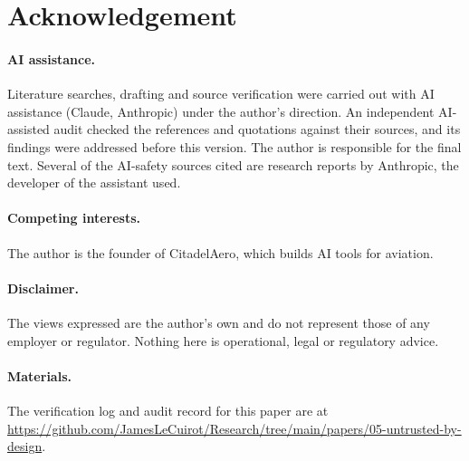 \documentclass[11pt]{article}
\begin{document}
\section*{Acknowledgement}
\paragraph{AI assistance.} Literature searches, drafting and source verification were carried out with AI assistance (Claude, Anthropic) under the author's direction. An independent AI-assisted audit checked the references and quotations against their sources, and its findings were addressed before this version. The author is responsible for the final text. Several of the AI-safety sources cited are research reports by Anthropic, the developer of the assistant used.
\paragraph{Competing interests.} The author is the founder of CitadelAero, which builds AI tools for aviation.
\paragraph{Disclaimer.} The views expressed are the author's own and do not represent those of any employer or regulator. Nothing here is operational, legal or regulatory advice.
\paragraph{Materials.} The verification log and audit record for this paper are at \url{https://github.com/JamesLeCuirot/Research/tree/main/papers/05-untrusted-by-design}.



\end{document}
